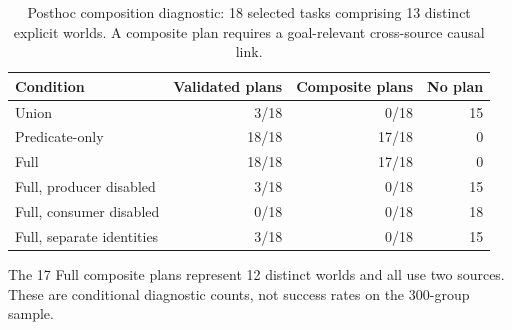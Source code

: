 \begin{table}[htbp]
\centering\small
\caption{Posthoc composition diagnostic: 18 selected tasks comprising 13 distinct explicit worlds. A composite plan requires a goal-relevant cross-source causal link.}
\label{tab:composition}
\begin{tabular}{lrrr}
\toprule
Condition & Validated plans & Composite plans & No plan \\
\midrule
Union & 3/18 & 0/18 & 15 \\
Predicate-only & 18/18 & 17/18 & 0 \\
Full & 18/18 & 17/18 & 0 \\
Full, producer disabled & 3/18 & 0/18 & 15 \\
Full, consumer disabled & 0/18 & 0/18 & 18 \\
Full, separate identities & 3/18 & 0/18 & 15 \\
\bottomrule
\end{tabular}
\par\smallskip\begin{minipage}{0.97\linewidth}\small The 17 Full composite plans represent 12 distinct worlds and all use two sources. These are conditional diagnostic counts, not success rates on the 300-group sample.\end{minipage}
\end{table}
